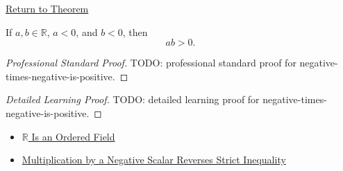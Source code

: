 \newpage
{}
\label{prf:negative-times-negative-is-positive}

\begin{remark*}[Return]
\hyperref[lem:negative-times-negative-is-positive]{Return to Theorem}
\end{remark*}

\begin{lemma*}
If $a,b\in\mathbb{R}$, $a<0$, and $b<0$, then
\[
ab>0.
\]
\end{lemma*}

\begin{proof}[Professional Standard Proof]
\LRAProofBodyStart
TODO: professional standard proof for negative-times-negative-is-positive.
\end{proof}

\begin{proof}[Detailed Learning Proof]
\LRAProofBodyStart
TODO: detailed learning proof for negative-times-negative-is-positive.
\end{proof}

\begin{remark*}
\end{remark*}

\begin{dependencies}
\begin{itemize}
  \item \hyperref[thm:r-is-an-ordered-field]{$\mathbb{R}$ Is an Ordered Field}
  \item \hyperref[thm:ineq-multiply-negative]{Multiplication by a Negative Scalar Reverses Strict Inequality}
\end{itemize}
\end{dependencies}

\clearpage
